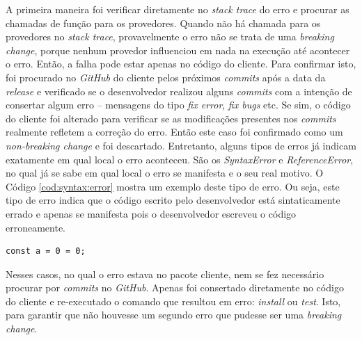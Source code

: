 A primeira maneira foi verificar diretamente no \textit{stack trace} do erro e procurar as chamadas de função para os provedores. Quando não há chamada para os provedores no \textit{stack trace}, provavelmente o erro não se trata de uma \textit{breaking change}, porque nenhum provedor influenciou em nada na execução até acontecer o erro. Então, a falha pode estar apenas no código do cliente. Para confirmar isto, foi procurado no \textit{GitHub} do cliente pelos próximos \textit{commits} após a data da \textit{release} e verificado se o desenvolvedor realizou alguns \textit{commits} com a intenção de consertar algum erro -- mensagens do tipo \textit{fix error}, \textit{fix bugs} etc. Se sim, o código do cliente foi alterado para verificar se as modificações presentes nos \textit{commits} realmente refletem a correção do erro. Então este caso foi confirmado como um \textit{non-breaking change} e foi descartado. Entretanto, alguns tipos de erros já indicam exatamente em qual local o erro aconteceu. São os \textit{SyntaxError} e \textit{ReferenceError}, no qual já se sabe em qual local o erro se manifesta e o seu real motivo. O Código \ref{cod:syntax:error} mostra um exemplo deste tipo de erro. Ou seja, este tipo de erro indica que o código escrito pelo desenvolvedor está sintaticamente errado e apenas se manifesta pois o desenvolvedor escreveu o código erroneamente.

\begin{lstlisting}[style=Javascript, label=cod:syntax:error, caption={Código com um Reference Error}]
const a = 0 = 0;
\end{lstlisting}

Nesses casos, no qual o erro estava no pacote cliente, nem se fez necessário procurar por \textit{commits} no \textit{GitHub}. Apenas foi consertado diretamente no código do cliente e re-executado o comando que resultou em erro: \textit{install} ou \textit{test}. Isto, para garantir que não houvesse um segundo erro que pudesse ser uma \textit{breaking change}.

